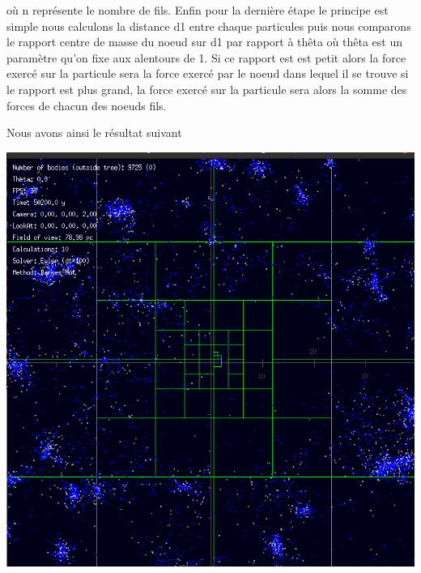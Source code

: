où n représente le nombre de fils.
\newline
Enfin  pour la dernière étape le principe est simple nous calculons la distance d1 entre chaque particules puis nous comparons le rapport centre de masse du noeud sur d1 par rapport à thêta où thêta est un paramètre qu'on fixe aux alentours de 1. Si ce rapport est est petit alors la force exercé sur la particule sera la force exercé par le noeud dans lequel il se trouve si le rapport est plus grand, la force exercé sur la particule sera alors la somme des forces de chacun des noeuds fils.


Nous avons ainsi le résultat suivant
\begin{center}
\includegraphics[scale=0.4]{./images/arbre_bh.png}
\label{figbh}
\end{center}